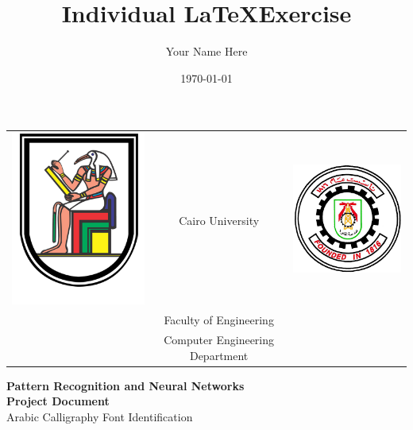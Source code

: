 \documentclass[12pt]{article}
\title{Individual \LaTeX\:Exercise}
\author{Your Name Here}
\date{\today} %
\begin{document}
\thispagestyle{empty}

\begin{center}
\begin{tabular}{ l c r }
\includegraphics[scale=2.5]{Cairo_University_Crest.png} &
Cairo University &
\includegraphics[scale=0.5]{download.png}
\\
& Faculty of Engineering & \\
& Computer Engineering Department & \\
\end{tabular}
\end{center}

\vspace{1.5cm}
\begin{center}
   \LARGE \textbf{Pattern Recognition and Neural Networks}
   \\
   \vspace{1cm}
   \LARGE \textbf {Project Document}
   \\
   \vspace{0.5cm}
   \LARGE {Arabic Calligraphy Font Identification}
\end{center}
\end{document}

